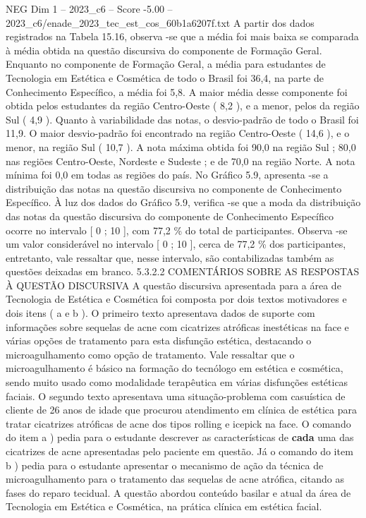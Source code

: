 \begin{textsample}{NEG Dim 1 – 2023\_c6 – Score -5.00 – 2023\_c6/enade\_2023\_tec\_est\_cos\_60b1a6207f.txt}
A partir dos dados registrados na Tabela 15.16, observa -se que a média foi mais baixa se comparada à média obtida na questão discursiva do componente de Formação Geral.
Enquanto no componente de Formação Geral, a média para estudantes de Tecnologia em Estética e Cosmética de todo o Brasil foi 36,4, na parte de Conhecimento Específico, a média foi 5,8.
A maior média desse componente foi obtida pelos estudantes da região Centro-Oeste ( 8,2 ), e a menor, pelos da região Sul ( 4,9 ).
Quanto à variabilidade das notas, o desvio-padrão de todo o Brasil foi 11,9.
O maior desvio-padrão foi encontrado na região Centro-Oeste ( 14,6 ), e o menor, na região Sul ( 10,7 ).
A nota máxima obtida foi 90,0 na região Sul ; 80,0 nas regiões Centro-Oeste, Nordeste e Sudeste ; e de 70,0 na região Norte.
A nota mínima foi 0,0 em todas as regiões do país.
No Gráfico 5.9, apresenta -se a distribuição das notas na questão discursiva no componente de Conhecimento Específico.
À luz dos dados do Gráfico 5.9, verifica -se que a moda da distribuição das notas da questão discursiva do componente de Conhecimento Específico ocorre no intervalo [ 0 ; 10 ], com 77,2 \% do total de participantes.
Observa -se um valor considerável no intervalo [ 0 ; 10 ], cerca de 77,2 \% dos participantes, entretanto, vale ressaltar que, nesse intervalo, são contabilizadas também as questões deixadas em branco. 5.3.2.2 COMENTÁRIOS SOBRE AS RESPOSTAS À QUESTÃO DISCURSIVA A questão discursiva apresentada para a área de Tecnologia de Estética e Cosmética foi composta por dois textos motivadores e dois itens ( a e b ).
O primeiro texto apresentava dados de suporte com informações sobre sequelas de acne com cicatrizes atróficas inestéticas na face e várias opções de tratamento para esta disfunção estética, destacando o microagulhamento como opção de tratamento.
Vale ressaltar que o microagulhamento é básico na formação do tecnólogo em estética e cosmética, sendo muito usado como modalidade terapêutica em várias disfunções estéticas faciais.
O segundo texto apresentava uma situação-problema com casuística de cliente de 26 anos de idade que procurou atendimento em clínica de estética para tratar cicatrizes atróficas de acne dos tipos rolling e icepick na face.
O comando do item a ) pedia para o estudante descrever as características de \textbf{cada} uma das cicatrizes de acne apresentadas pelo paciente em questão.
Já o comando do item b ) pedia para o estudante apresentar o mecanismo de ação da técnica de microagulhamento para o tratamento das sequelas de acne atrófica, citando as fases do reparo tecidual.
A questão abordou conteúdo basilar e atual da área de Tecnologia em Estética e Cosmética, na prática clínica em estética facial.

\end{textsample}
